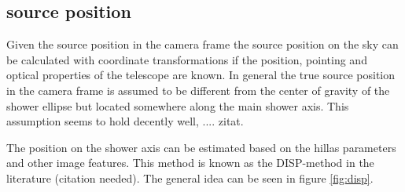 

\subsection{source position}
\label{sec:source_position}
Given the source position in the camera frame the source position
on the sky can be calculated with coordinate transformations if
the position, pointing and optical properties of the
telescope are known.
In general the true source position in the camera frame is assumed to be
different from the center of gravity of the shower ellipse
but located somewhere along the main shower axis.
This assumption seems to hold decently well, .... zitat.

The position on the shower axis can be estimated based on 
the hillas parameters and other image features.
This method is known as the DISP-method in the
literature (citation needed). The general idea 
can be seen in figure \ref{fig:disp}.

